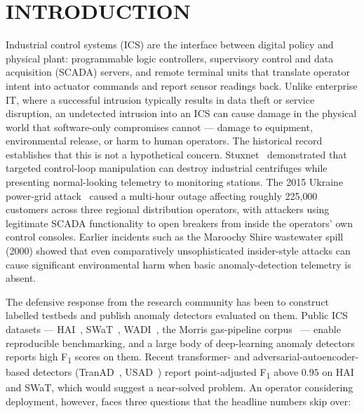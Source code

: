 \chapter*{INTRODUCTION}
\label{ch:intro}

Industrial control systems (ICS) are the interface between digital policy and physical plant: programmable logic controllers, supervisory control and data acquisition (SCADA) servers, and remote terminal units that translate operator intent into actuator commands and report sensor readings back.  Unlike enterprise IT, where a successful intrusion typically results in data theft or service disruption, an undetected intrusion into an ICS can cause damage in the physical world that software-only compromises cannot --- damage to equipment, environmental release, or harm to human operators.  The historical record establishes that this is not a hypothetical concern.  Stuxnet~\cite{langner2013stuxnet} demonstrated that targeted control-loop manipulation can destroy industrial centrifuges while presenting normal-looking telemetry to monitoring stations.  The 2015 Ukraine power-grid attack~\cite{ukraine2016analysis} caused a multi-hour outage affecting roughly 225{,}000 customers across three regional distribution operators, with attackers using legitimate SCADA functionality to open breakers from inside the operators' own control consoles.  Earlier incidents such as the Maroochy Shire wastewater spill (2000) showed that even comparatively unsophisticated insider-style attacks can cause significant environmental harm when basic anomaly-detection telemetry is absent.

The defensive response from the research community has been to construct labelled testbeds and publish anomaly detectors evaluated on them.  Public ICS datasets --- HAI~\cite{shin2020hai}, SWaT~\cite{goh2017swat}, WADI~\cite{ahmed2017wadi}, the Morris gas-pipeline corpus~\cite{morris2014industrial} --- enable reproducible benchmarking, and a large body of deep-learning anomaly detectors reports high F\textsubscript{1} scores on them.  Recent transformer- and adversarial-autoencoder-based detectors (TranAD~\cite{tuli2022tranad}, USAD~\cite{audibert2020usad}) report point-adjusted F\textsubscript{1} above $0.95$ on HAI and SWaT, which would suggest a near-solved problem.  An operator considering deployment, however, faces three questions that the headline numbers skip over:

